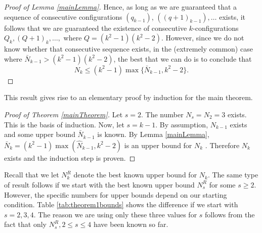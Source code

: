 \documentclass[reqno,12pt]{amsart}
\theoremstyle{plain}
\theoremstyle{definition}
\theoremstyle{remark}
\begin{document}
\begin{proof}[Proof of Lemma \ref{mainLemma}]
Hence, as long as we are guaranteed that a sequence of consecutive configurations $(q_{k-1})$, $((q+1)_{k-1}), \ldots$ 
exists, it follows that we are guaranteed the existence of consecutive $k$-config\-u\-ra\-tions $Q_{k}, (Q+1)_{k}, \ldots,$ 
where $Q = (k^{2}-1)(k^{2}-2)$. 
However, since we do not know whether that consecutive sequence exists, in the (extremely common) case 
where $\bar{N}_{k-1} > (k^{2}-1)(k^{2}-2)$, the best that we can do is to conclude that
\[ N_{k} \leq (k^{2}-1) \max\{ \bar{N}_{k-1}, k^{2} - 2\}.\]
\end{proof}

This result gives rise to an elementary proof by induction for the main theorem.



\begin{proof}[Proof of Theorem \ref{mainTheorem}] 
Let $s = 2$.  The number $N_{s} = N_2 = 3$ exists. This is the basis of induction. Now, let $s = k -1$. By assumption, $N_{k-1}$ exists 
and some upper bound $\bar{N}_{k-1}$ is known.  By Lemma \ref{mainLemma}, $\bar{N}_k =  (k^2-1)\max(\hat{N}_{k-1},k^2-2)$ is 
an upper bound for $N_k$ . Therefore $N_k$ exists and the induction step is proven.
\end{proof}

Recall that we let $N^{R}_{k}$ denote the best known upper bound for $N_{k}$. The same type of result follows if we start 
with the best known upper bound $N^R_s$ for some $s \geq 2$. However, the specific numbers for upper bounds depend on 
our starting condition. Table \ref{tab:theorem1bounds} shows the difference if we start with $s = 2,3,4$. The reason we are 
using only these three values for $s$ follows from the fact that only $N^R_s, 2 \leq s \leq 4$ have been known so far.
\end{document}
